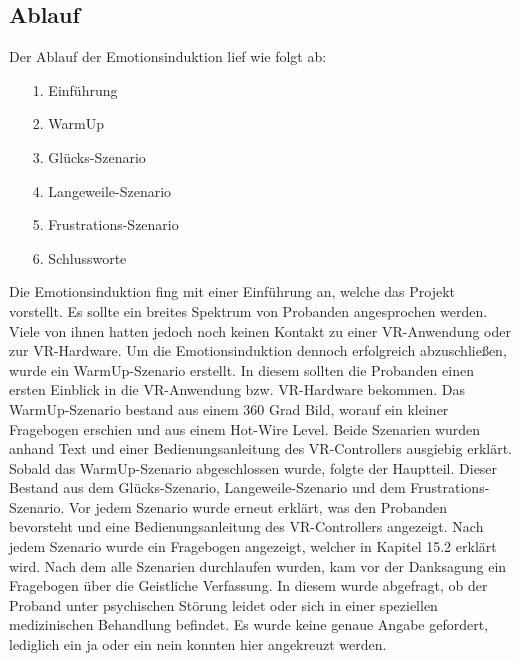 \subsection{Ablauf} \label{ablauf-subsubsec}




Der Ablauf der Emotionsinduktion lief wie folgt ab:


\begin{itemize}
\item[1.] Einführung %
\item[2.] WarmUp %
\item[3.] Glücks-Szenario %
\item[4.] Langeweile-Szenario %
\item[5.] Frustrations-Szenario
\item[6.] Schlussworte
\end{itemize}


Die Emotionsinduktion fing mit einer Einführung an, welche das Projekt vorstellt.
Es sollte ein breites Spektrum von Probanden angesprochen werden. 
Viele von ihnen hatten jedoch noch keinen Kontakt zu einer VR-Anwendung oder zur VR-Hardware. 
Um die Emotionsinduktion dennoch erfolgreich abzuschließen, wurde ein WarmUp-Szenario erstellt. 
In diesem sollten die Probanden einen ersten Einblick in die VR-Anwendung bzw. VR-Hardware bekommen. 
Das WarmUp-Szenario bestand aus einem 360 Grad Bild, worauf ein kleiner Fragebogen erschien und aus einem Hot-Wire Level. 
Beide Szenarien wurden anhand Text und einer Bedienungsanleitung des VR-Controllers ausgiebig erklärt. 
Sobald das WarmUp-Szenario abgeschlossen wurde, folgte der Hauptteil. 
Dieser Bestand aus dem Glücks-Szenario, Langeweile-Szenario und dem Frustrations-Szenario. 
Vor jedem Szenario wurde erneut erklärt, was den Probanden bevorsteht und eine Bedienungsanleitung des VR-Controllers angezeigt. 
Nach jedem Szenario wurde ein Fragebogen angezeigt, welcher in Kapitel 15.2 erklärt wird. 
Nach dem alle Szenarien durchlaufen wurden, kam vor der Danksagung ein Fragebogen über die Geistliche Verfassung. 
In diesem wurde abgefragt, ob der Proband unter psychischen Störung leidet oder sich in einer speziellen medizinischen Behandlung befindet. 
Es wurde keine genaue Angabe gefordert, lediglich ein ja oder ein nein konnten hier angekreuzt werden. 

